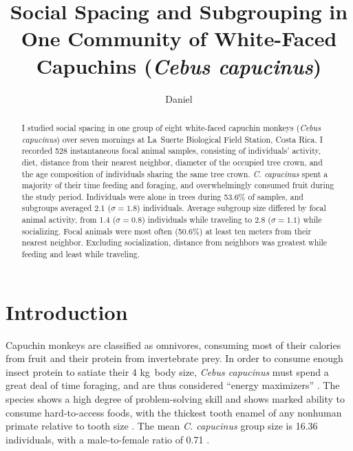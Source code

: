 \documentclass{../../../coursework}
\title{Social Spacing and Subgrouping in One Community of White-Faced Capuchins (\emph{Cebus capucinus})}
\subtitle{}
\author{Daniel}{Glenn}{Leonard}
\date{\displaydate{date}}
\begin{document}
\maketitle

\begin{abstract}
    I studied social spacing in one group of eight white-faced capuchin
    monkeys (\emph{Cebus capucinus}) over seven mornings at La~Suerte
    Biological Field Station, Costa Rica. I recorded 528 instantaneous focal
    animal samples, consisting of individuals' activity, diet, distance from
    their nearest neighbor, diameter of the occupied tree crown, and the age
    composition of individuals sharing the same tree crown.
    \emph{C. capucinus} spent a majority of their time feeding and foraging,
    and overwhelmingly consumed fruit during the study period. Individuals
    were alone in trees during 53.6\% of samples, and subgroups averaged 2.1
    (\(\sigma = 1.8\)) individuals. Average subgroup size differed by focal
    animal activity, from 1.4 (\(\sigma = 0.8\)) individuals while traveling
    to 2.8 (\(\sigma = 1.1\)) while socializing. Focal animals were most often
    (50.6\%) at least ten meters from their nearest neighbor. Excluding
    socialization, distance from neighbors was greatest while feeding and
    least while traveling.
\end{abstract}

\printkeywords

\section{Introduction}

Capuchin monkeys are classified as omnivores, consuming most of their calories
from fruit and their protein from invertebrate prey. In order to consume
enough insect protein to satiate their 4 kg~body size, \emph{Cebus capucinus}
must spend a great deal of time foraging, and are thus considered ``energy
maximizers'' \parencite{Fragaszy2004}. The species shows a high degree of
problem-solving skill and shows marked ability to consume hard-to-access
foods, with the thickest tooth enamel of any nonhuman primate relative to
tooth size \parencite{Jack2011}. The mean \emph{C. capucinus} group size is
16.36 individuals, with a male-to-female ratio of 0.71
\parencite{Fragaszy2004}.
\end{document}
